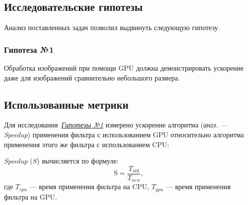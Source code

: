 \subsection{Исследовательские гипотезы}
\noindent Анализ поставленных задач позволил выдвинуть следующую гипотезу.

\subsubsection*{Гипотеза №1}
\label{t1}
\noindent Обработка изображений при помощи GPU должна демонстрировать ускорение даже для изображений сравнительно небольшого размера.



\subsection{Использованные метрики}
\noindent Для исследования~\hyperref[t1]{\textit{Гипотезы №1}} измерено ускорение алгоритма (\textit{англ. --- Speedup}) применения фильтра с использованием GPU относительно алгоритма применения этого же фильтра с использованием CPU:

\textit{Speedup} ($S$) вычисляется по формуле:
\begin{equation}
\label{eq:speedup}
	\text{S} = \frac{T_{old}}{T_{new}},
\end{equation}
где $T_{cpu}$ --- время применения фильтра на CPU, $T_{gpu}$ --- время применения фильтра на GPU.


